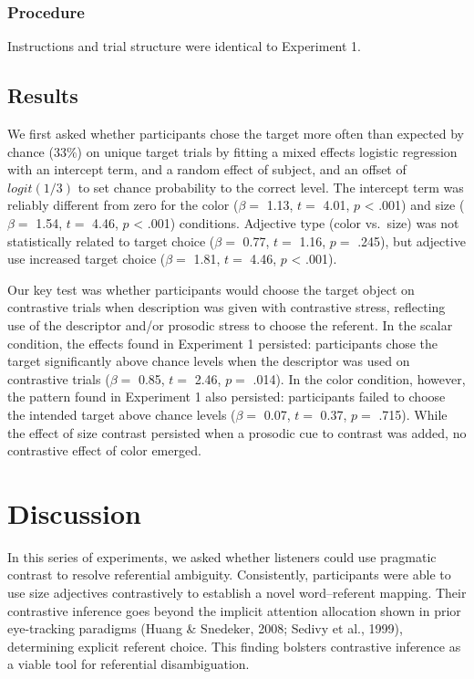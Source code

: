 \documentclass[10pt, letterpaper]{article}
\begin{document}
\subsubsection{Procedure}\label{procedure-1}

Instructions and trial structure were identical to Experiment 1.

\subsection{Results}\label{results-2}

We first asked whether participants chose the target more often than
expected by chance (\(33\%\)) on unique target trials by fitting a mixed
effects logistic regression with an intercept term, and a random effect
of subject, and an offset of \(logit(1/3)\) to set chance probability to
the correct level. The intercept term was reliably different from zero
for the color (\(\beta =\) 1.13, \(t =\) 4.01, \(p\) \textless{} .001)
and size (\(\beta =\) 1.54, \(t =\) 4.46, \(p\) \textless{} .001)
conditions. Adjective type (color vs.~size) was not statistically
related to target choice (\(\beta =\) 0.77, \(t =\) 1.16, \(p =\) .245),
but adjective use increased target choice (\(\beta =\) 1.81, \(t =\)
4.46, \(p\) \textless{} .001).

Our key test was whether participants would choose the target object on
contrastive trials when description was given with contrastive stress,
reflecting use of the descriptor and/or prosodic stress to choose the
referent. In the scalar condition, the effects found in Experiment 1
persisted: participants chose the target significantly above chance
levels when the descriptor was used on contrastive trials (\(\beta =\)
0.85, \(t =\) 2.46, \(p =\) .014). In the color condition, however, the
pattern found in Experiment 1 also persisted: participants failed to
choose the intended target above chance levels (\(\beta =\) 0.07,
\(t =\) 0.37, \(p =\) .715). While the effect of size contrast persisted
when a prosodic cue to contrast was added, no contrastive effect of
color emerged.

\section{Discussion}\label{discussion}

In this series of experiments, we asked whether listeners could use
pragmatic contrast to resolve referential ambiguity. Consistently,
participants were able to use size adjectives contrastively to establish
a novel word--referent mapping. Their contrastive inference goes beyond
the implicit attention allocation shown in prior eye-tracking paradigms
(Huang \& Snedeker, 2008; Sedivy et al., 1999), determining explicit
referent choice. This finding bolsters contrastive inference as a viable
tool for referential disambiguation.
\end{document}
